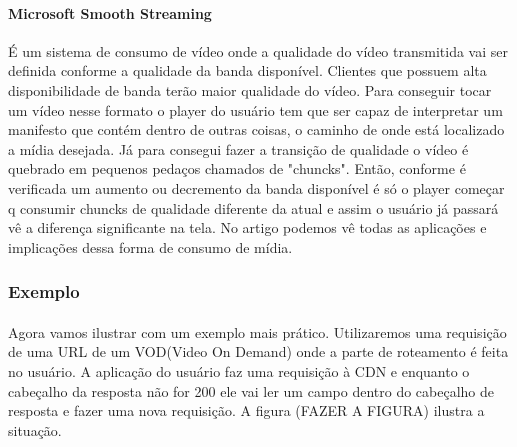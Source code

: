 \paragraph{Microsoft Smooth Streaming} \'E um sistema de consumo de v\'ideo onde a qualidade do v\'ideo transmitida vai ser definida conforme a qualidade da banda dispon\'ivel. Clientes que possuem alta disponibilidade de banda ter\~ao maior qualidade do v\'ideo. 
\newline Para conseguir tocar um v\'ideo nesse formato o player do usu\'ario tem que ser capaz de interpretar um manifesto que cont\'em dentro de outras coisas, o caminho de onde est\'a localizado a m\'idia desejada. 
\newline J\'a para consegui fazer a transi\c{c}\~ao de qualidade o v\'ideo \'e quebrado em pequenos peda\c{c}os chamados de "chuncks". Ent\~ao, conforme \'e verificada um aumento ou decremento da banda dispon\'ivel \'e s\'o o player come\c{c}ar q consumir chuncks de qualidade diferente da atual e assim o usu\'ario j\'a passar\'a v\^e a diferen\c{c}a significante na tela. 
\newline No artigo \cite{zambelli2009iis} podemos v\^e todas as aplica\c{c}\~oes e implica\c{c}\~oes dessa forma de consumo de m\'idia.
\subsubsection{Exemplo}
\paragraph{} Agora vamos ilustrar com um exemplo mais pr\'atico. Utilizaremos uma requisi\c{c}\~ao de uma URL de um VOD(Video On Demand) onde a parte de roteamento \'e feita no usu\'ario. A aplica\c{c}\~ao do usu\'ario faz uma requisi\c{c}\~ao \`a CDN e enquanto o cabe\c{c}alho da resposta n\~ao for 200 ele vai ler um campo dentro do cabe\c{c}alho de resposta e fazer uma nova requisi\c{c}\~ao. A figura (FAZER A FIGURA) ilustra a situa\c{c}\~ao.

